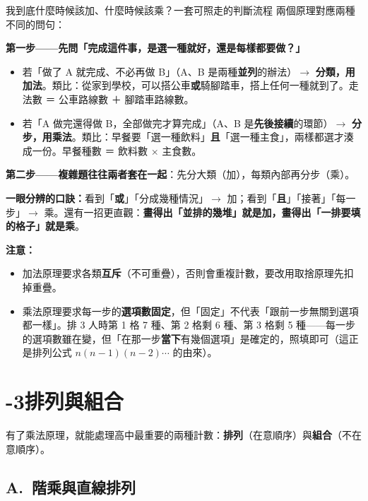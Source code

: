 \documentclass[11pt]{article}
\begin{document}
\begin{補充框}{我到底什麼時候該加、什麼時候該乘？一套可照走的判斷流程}
兩個原理對應兩種不同的問句：

\textbf{第一步——先問「完成這件事，是選一種就好，還是每樣都要做？」}
\begin{itemize}\setlength{\itemsep}{1pt}
\item 若「做了 A 就完成、不必再做 B」（A、B 是兩種\textbf{並列}的辦法）$\rightarrow$ \textbf{分類，用加法}。類比：從家到學校，可以搭公車\textbf{或}騎腳踏車，搭上任何一種就到了。走法數 ＝ 公車路線數 ＋ 腳踏車路線數。
\item 若「A 做完還得做 B，全部做完才算完成」（A、B 是\textbf{先後接續}的環節）$\rightarrow$ \textbf{分步，用乘法}。類比：早餐要「選一種飲料」\textbf{且}「選一種主食」，兩樣都選才湊成一份。早餐種數 ＝ 飲料數 $\times$ 主食數。
\end{itemize}

\textbf{第二步——複雜題往往兩者套在一起}：先分大類（加），每類內部再分步（乘）。

\textbf{一眼分辨的口訣：}看到「\textbf{或}」「分成幾種情況」$\rightarrow$ 加；看到「\textbf{且}」「接著」「每一步」$\rightarrow$ 乘。還有一招更直觀：\textbf{畫得出「並排的幾堆」就是加，畫得出「一排要填的格子」就是乘}。
\end{補充框}

\textbf{注意：}
\begin{itemize}\setlength{\itemsep}{1pt}
\item 加法原理要求各類\textbf{互斥}（不可重疊），否則會重複計數，要改用取捨原理先扣掉重疊。
\item 乘法原理要求每一步的\textbf{選項數固定}，但「固定」不代表「跟前一步無關到選項都一樣」。排 3 人時第 1 格 7 種、第 2 格剩 6 種、第 3 格剩 5 種——每一步的選項數雖在變，但「在那一步\textbf{當下}有幾個選項」是確定的，照填即可（這正是排列公式 $n(n-1)(n-2)\cdots$ 的由來）。
\end{itemize}

\section*{-3\quad 排列與組合}

有了乘法原理，就能處理高中最重要的兩種計數：\textbf{排列}（在意順序）與\textbf{組合}（不在意順序）。

\subsection*{\sffamily A.\ 階乘與直線排列}
\end{document}
